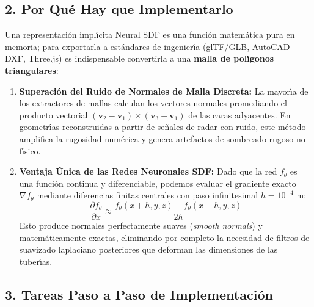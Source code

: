 \documentclass[11pt,a4paper]{article}
\begin{document}
\subsection{2. Por Qu{\'e} Hay que Implementarlo}
Una representaci{\'o}n impl{\'\i}cita Neural SDF es una funci{\'o}n matem{\'a}tica pura en memoria; para exportarla a est{\'a}ndares de ingenier{\'\i}a (glTF/GLB, AutoCAD DXF, Three.js) es indispensable convertirla a una \textbf{malla de pol{\'\i}gonos triangulares}:
\begin{enumerate}
    \item \textbf{Superaci{\'o}n del Ruido de Normales de Malla Discreta:} La mayor{\'\i}a de los extractores de mallas calculan los vectores normales promediando el producto vectorial $(\mathbf{v}_2 - \mathbf{v}_1) \times (\mathbf{v}_3 - \mathbf{v}_1)$ de las caras adyacentes. En geometr{\'\i}as reconstruidas a partir de se{\~n}ales de radar con ruido, este m{\'e}todo amplifica la rugosidad num{\'e}rica y genera artefactos de sombreado rugoso no f{\'\i}sico.
    \item \textbf{Ventaja {\'U}nica de las Redes Neuronales SDF:} Dado que la red $f_\theta$ es una funci{\'o}n continua y diferenciable, podemos evaluar el gradiente exacto $\nabla f_\theta$ mediante diferencias finitas centrales con paso infinitesimal $h = 10^{-4}\text{ m}$:
    \begin{equation}
        \frac{\partial f_\theta}{\partial x} \approx \frac{f_\theta(x+h, y, z) - f_\theta(x-h, y, z)}{2h}
    \end{equation}
    Esto produce normales perfectamente suaves (\textit{smooth normals}) y matem{\'a}ticamente exactas, eliminando por completo la necesidad de filtros de suavizado laplaciano posteriores que deforman las dimensiones de las tuber{\'\i}as.
\end{enumerate}

\subsection{3. Tareas Paso a Paso de Implementaci{\'o}n}
\end{document}
